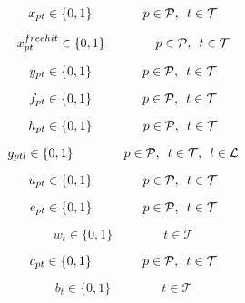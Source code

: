 \begin{equation} \label{eq:bin_x}
    x_{pt} \in \{0,1\} \qquad\qquad p \in \mathcal{P}, \enskip t \in \mathcal{T}
\end{equation}

\begin{equation} \label{eq:free_hit_bin_x}
    x^{free hit}_{pt} \in \{0,1\} \qquad\qquad p \in \mathcal{P}, \enskip t \in \mathcal{T}
\end{equation}

\begin{equation} \label{eq:bin_y}
    y_{pt} \in \{0,1\} \qquad\qquad p \in \mathcal{P}, \enskip t \in \mathcal{T}
\end{equation}

\begin{equation} \label{eq:bin_f}
    f_{pt} \in \{0,1\} \qquad\qquad p \in \mathcal{P}, \enskip t \in \mathcal{T}
\end{equation}

\begin{equation} \label{eq:bin_h}
    h_{pt} \in \{0,1\} \qquad\qquad p \in \mathcal{P}, \enskip t \in \mathcal{T}
\end{equation}
 
\begin{equation} \label{eq:binf_g}
    g_{ptl} \in \{0,1\} \qquad\qquad p \in \mathcal{P}, \enskip t \in \mathcal{T},\enskip l \in \mathcal{L}
\end{equation}

\begin{equation} \label{eq:bin_u}
    u_{pt} \in \{0,1\} \qquad\qquad p \in \mathcal{P}, \enskip t \in \mathcal{T} 
\end{equation}

\begin{equation} \label{eq:nonn_e}
    e_{pt} \in \{0,1\} \qquad\qquad p \in \mathcal{P}, \enskip t \in \mathcal{T} 
\end{equation}

\begin{equation} \label{eq:wildcard_bin_w}
    w_{t} \in \{0,1\} \qquad\qquad  t \in \mathcal{T}
\end{equation}

\begin{equation} \label{eq:triple_captain_bin_c}
    c_{pt} \in \{0,1\} \qquad\qquad p \in \mathcal{P}, \enskip t \in \mathcal{T} 
\end{equation}

\begin{equation} \label{eq:bench_boost_bin_b}
    b_{t} \in \{0,1\} \qquad\qquad  t \in \mathcal{T}
\end{equation}

